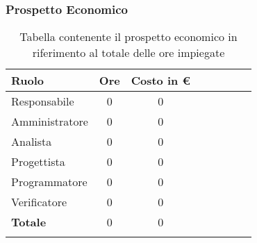 \documentclass[../piano_di_progetto.tex]{subfiles}
\begin{document}
\subsubsection{Prospetto Economico}

\begin{center}
	\begin{longtable}{|l|c|c|c|c|c|c|c|}
		\hline
		\rowcolor{lightgray}
		\textbf{Ruolo} & \textbf{Ore} & \textbf{Costo in €}\\

		\hline
		Responsabile & 0 & 0\\
		\hline
		Amministratore & 0 & 0\\
		\hline
		Analista & 0 & 0\\
		\hline
		Progettista & 0 & 0\\
		\hline
		Programmatore & 0 & 0\\
		\hline
		Verificatore & 0 & 0\\
		\hline
		\textbf{Totale} & 0 & 0\\
		\hline
		\caption{Tabella contenente il prospetto economico in riferimento al totale delle ore impiegate}
	\end{longtable}
\end{center}
\end{document}
